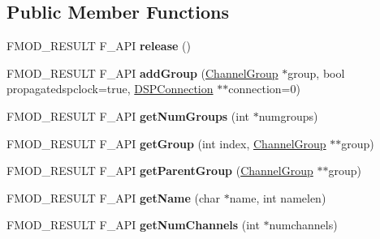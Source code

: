 \subsection*{Public Member Functions}
\begin{DoxyCompactItemize}
\item 
\mbox{\label{classFMOD_1_1ChannelGroup_a4f7fc3cf21050e3cd5e84f8a2f9a0fc9}} 
F\+M\+O\+D\+\_\+\+R\+E\+S\+U\+LT F\+\_\+\+A\+PI {\bfseries release} ()
\item 
\mbox{\label{classFMOD_1_1ChannelGroup_a8f9abbc359b51ed16f8bf158b0d62ba6}} 
F\+M\+O\+D\+\_\+\+R\+E\+S\+U\+LT F\+\_\+\+A\+PI {\bfseries add\+Group} (\hyperlink{classFMOD_1_1ChannelGroup}{Channel\+Group} $\ast$group, bool propagatedspclock=true, \hyperlink{classFMOD_1_1DSPConnection}{D\+S\+P\+Connection} $\ast$$\ast$connection=0)
\item 
\mbox{\label{classFMOD_1_1ChannelGroup_afa0b87ae5828685c64c1aa921872fd58}} 
F\+M\+O\+D\+\_\+\+R\+E\+S\+U\+LT F\+\_\+\+A\+PI {\bfseries get\+Num\+Groups} (int $\ast$numgroups)
\item 
\mbox{\label{classFMOD_1_1ChannelGroup_a5ac9853233cf3fa367022f1219db26ff}} 
F\+M\+O\+D\+\_\+\+R\+E\+S\+U\+LT F\+\_\+\+A\+PI {\bfseries get\+Group} (int index, \hyperlink{classFMOD_1_1ChannelGroup}{Channel\+Group} $\ast$$\ast$group)
\item 
\mbox{\label{classFMOD_1_1ChannelGroup_ab953a5c6bf1dc0d25bed4af7c0653bee}} 
F\+M\+O\+D\+\_\+\+R\+E\+S\+U\+LT F\+\_\+\+A\+PI {\bfseries get\+Parent\+Group} (\hyperlink{classFMOD_1_1ChannelGroup}{Channel\+Group} $\ast$$\ast$group)
\item 
\mbox{\label{classFMOD_1_1ChannelGroup_a152e3dfbbde9a125c002845e8ffd9231}} 
F\+M\+O\+D\+\_\+\+R\+E\+S\+U\+LT F\+\_\+\+A\+PI {\bfseries get\+Name} (char $\ast$name, int namelen)
\item 
\mbox{\label{classFMOD_1_1ChannelGroup_a31d5e3b8424b09069841b40633dee207}} 
F\+M\+O\+D\+\_\+\+R\+E\+S\+U\+LT F\+\_\+\+A\+PI {\bfseries get\+Num\+Channels} (int $\ast$numchannels)
\item 
$$
\end{DoxyCompactItemize}
